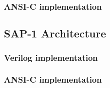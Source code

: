 \subsubsection{ANSI-C implementation}





\subsection{SAP-1 Architecture}

\subsubsection{Verilog implementation}

\subsubsection{ANSI-C implementation}

